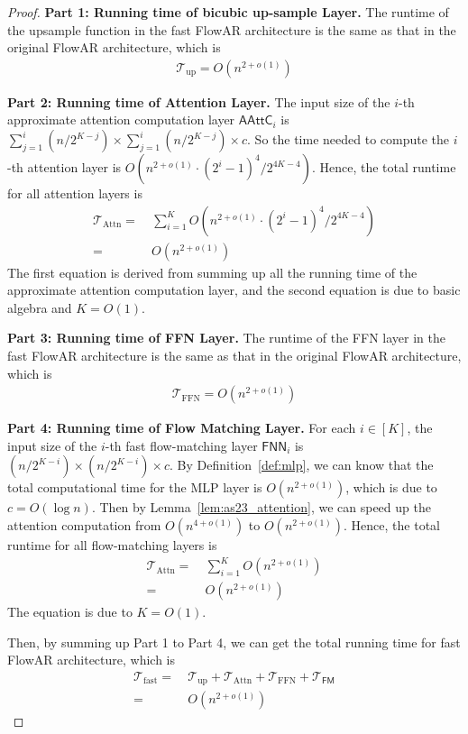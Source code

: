 \begin{proof}
    {\bf Part 1: Running time of bicubic up-sample Layer.} The runtime of the upsample function in the fast FlowAR architecture is the same as that in the original FlowAR architecture, which is
    \begin{align*}
        \mathcal{T}_{\mathrm{up}} =  O(n^{2+o(1)})
    \end{align*}
    

    {\bf Part 2: Running time of Attention Layer.} The input size of the $i$-th approximate attention computation layer $\mathsf{AAttC}_i$ is $\sum_{j=1}^i (n/2^{K-j}) \times \sum_{j=1}^i(n/2^{K-j}) \times c $. So the time needed to compute the $i$-th attention layer is $O(n^{2+o(1)} \cdot (2^i-1)^4/2^{4K-4})$. Hence, the total runtime for all attention layers is
    \begin{align*}
        \mathcal{T}_{\mathrm{Attn}} =&~ \sum_{i=1}^K O( n^{2+o(1)} \cdot (2^i-1)^4/2^{4K-4})\\
        =&~ O(n^{2+o(1)})
    \end{align*}
    The first equation is derived from summing up all the running time of the approximate attention computation layer, and the second equation is due to basic algebra and $K = O(1)$.

    {\bf Part 3: Running time of FFN Layer.} The runtime of the FFN layer in the fast FlowAR architecture is the same as that in the original FlowAR architecture, which is
    \begin{align*}
        \mathcal{T}_{\mathrm{FFN}} =  O(n^{2+o(1)})
    \end{align*}

    {\bf Part 4: Running time of Flow Matching Layer.} For each $i \in [K]$, the input size of the $i$-th fast flow-matching layer $\mathsf{FNN}_i$ is $ (n/2^{K-i}) \times (n/2^{K-i}) \times c $. By Definition~\ref{def:mlp}, we can know that the total computational time for the MLP layer is $O(n^{2+o(1)})$, which is due to $c=O(\log n)$. Then by Lemma~\ref{lem:as23_attention}, we can speed up the attention computation from $O(n^{4+o(1)})$ to $O(n^{2+o(1)})$. Hence, the total runtime for all flow-matching layers is
     \begin{align*}
        \mathcal{T}_{\mathrm{Attn}} =&~ \sum_{i=1}^K O( n^{2+o(1)})\\
        =&~ O(n^{2+o(1)})
    \end{align*}
    The equation is due to $K = O(1)$.

    Then, by summing up Part 1 to Part 4, we can get the total running time for fast FlowAR architecture, which is
    \begin{align*}
        \mathcal{T}_{\mathrm{fast}} =&~ \mathcal{T}_{\mathrm{up}} + \mathcal{T}_{\mathrm{Attn}} + \mathcal{T}_{\mathrm{FFN}} + \mathcal{T}_{\mathsf{FM}}\\
        =&~ O(n^{2+o(1)})
    \end{align*}
    
    
\end{proof}


